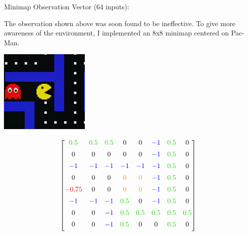\begin{frame}{Minimap Observation Vector (64 inputs):}
	
    The observation shown above was soon found to be ineffective. To give more awareness of the environment, I implemented an 8x8 minimap centered on Pac-Man.

    \vspace{-0.5em}

    \begin{minipage}{0.4\textwidth}
        \centering
        \vspace{0.5em}
        \includegraphics[width=0.8\linewidth]{assets/minimap.png}
    \end{minipage}
    \hspace{0.5em}
    \begin{minipage}{0.5\textwidth}
        \scriptsize
        $$
        \begin{bmatrix}
        \green{0.5} & \green{0.5} & \green{0.5} & 0 & 0 & \blue{-1} & \green{0.5} & 0 \\[0.5em]
        0 & 0 & 0 & 0 & 0 & \blue{-1} & \green{0.5} & 0 \\[0.5em]
        \blue{-1} & \blue{-1} & \blue{-1} & \blue{-1} & \blue{-1} & \blue{-1} & \green{0.5} & 0 \\[0.5em]
        0 & 0 & 0 & \yellow{0} & \yellow{0} & \blue{-1} & \green{0.5} & 0 \\[0.5em]
        \red{-0.75} & 0 & 0 & \yellow{0} & \yellow{0} & \blue{-1} & \green{0.5} & 0 \\[0.5em]
        \blue{-1} & \blue{-1} & \blue{-1} & \green{0.5} & 0 & \blue{-1} & \green{0.5} & 0 \\[0.5em]
        0 & 0 & \blue{-1} & \green{0.5} & \green{0.5} & \green{0.5} & \green{0.5} & \green{0.5} \\[0.5em]
        0 & 0 & \blue{-1} & \green{0.5} & 0 & 0 & \green{0.5} & 0 \\[0.5em]
        \end{bmatrix}
        $$
    \end{minipage}



\end{frame}
